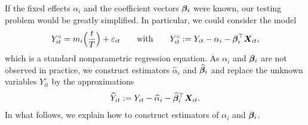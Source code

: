\documentclass[a4paper,12pt]{article}
\makeatletter
\renewcommand{\eqref}[1]{\tagform@{\ref{#1}}}
\makeatother
\begin{document}
If the fixed effects $\alpha_i$ and the coefficient vectors $\bm{\beta}_i$ were known, our testing problem would be greatly simplified. In particular, we could consider the model
\begin{align*}
Y_{it}^\circ = m_i \Big( \frac{t}{T} \Big) + \varepsilon_{it} \qquad \text{with} \qquad Y_{it}^\circ := Y_{it} - \alpha_i - \bm{\beta}_i^\top \boldsymbol{X}_{it}, 
\end{align*}
which is a standard nonparametric regression equation. As $\alpha_i$ and $\bm{\beta}_i$ are not observed in practice, we construct estimators $\widehat{\alpha}_i$ and $\widehat{\bm{\beta}}_i$ and replace the unknown variables $Y_{it}^\circ$ by the approximations 
\begin{align*}
\widehat{Y}_{it} := Y_{it} -\widehat{\alpha}_i - \widehat{\bfbeta}_i^\top \X_{it}. %
\end{align*}
In what follows, we explain how to construct estimators of $\alpha_i$ and $\bm{\beta}_i$. 


\end{document}
